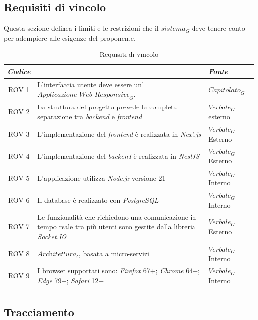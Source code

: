 \documentclass[12pt, oneside]{article}
\begin{document}
\subsection{Requisiti di vincolo}
Questa sezione delinea i limiti e le restrizioni che il $\textit{sistema}_G$ deve tenere conto per adempiere alle esigenze del proponente.
\begin{longtable}{|c|p{14cm}|p{2cm}|}
    \hline
    \emph{Codice} & \centering{\emph{Descrizione}} &  \emph{Fonte} \\
    \hline
    \endfirsthead
    \endhead
    ROV 1& L'interfaccia utente deve essere un'$\textit{Applicazione Web Responsive}_G$.  & $\textit{Capitolato}_G$  \\
    \hline
    ROV 2& La struttura del progetto prevede la completa separazione tra \textit{backend} e \textit{frontend}  & $\textit{Verbale}_G$ esterno  \\
    \hline
    ROV 3& L'implementazione del \textit{frontend} è realizzata in \textit{Next.js}  & $\textit{Verbale}_G$ Esterno  \\
    \hline
    ROV 4& L'implementazione del \textit{backend} è realizzata in \textit{NestJS}  & $\textit{Verbale}_G$ Esterno  \\
    \hline
    ROV 5& L'applicazione utilizza \textit{Node.js} versione 21 & $\textit{Verbale}_G$ Interno  \\
    \hline
    ROV 6& Il database è realizzato con \textit{PostgreSQL}  & $\textit{Verbale}_G$ Interno  \\
    \hline
    ROV 7& Le funzionalità che richiedono una comunicazione in tempo reale tra più utenti sono gestite dalla libreria \textit{Socket.IO}  & $\textit{Verbale}_G$ Esterno  \\
    \hline
    ROV 8& $\textit{Architettura}_G$ basata a micro-servizi & $\textit{Verbale}_G$ Interno  \\
    \hline
    ROV 9& I browser supportati sono: \textit{Firefox} 67+; \textit{Chrome} 64+; \textit{Edge} 79+; \textit{Safari} 12+  & $\textit{Verbale}_G$ Interno  \\
    \hline
\caption{Requisiti di vincolo}
\end{longtable}


\setlength{\extrarowheight}{8pt}
\subsection{Tracciamento}
\end{document}

